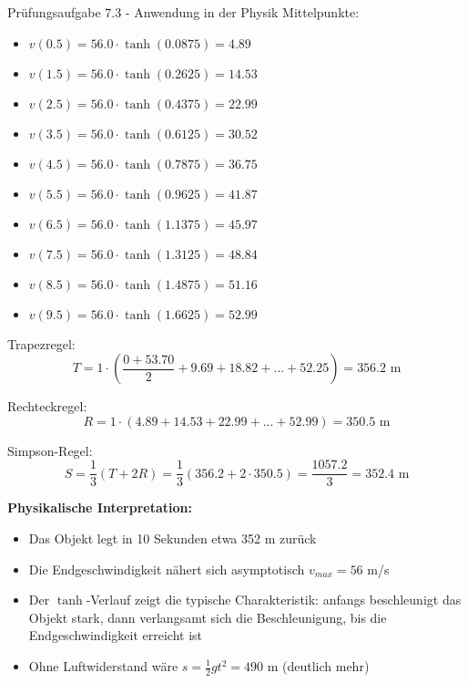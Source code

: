 \begin{example2}{Prüfungsaufgabe 7.3 - Anwendung in der Physik}
Mittelpunkte:
\begin{itemize}
    \item $v(0.5) = 56.0 \cdot \tanh(0.0875) = 4.89$
    \item $v(1.5) = 56.0 \cdot \tanh(0.2625) = 14.53$
    \item $v(2.5) = 56.0 \cdot \tanh(0.4375) = 22.99$
    \item $v(3.5) = 56.0 \cdot \tanh(0.6125) = 30.52$
    \item $v(4.5) = 56.0 \cdot \tanh(0.7875) = 36.75$
    \item $v(5.5) = 56.0 \cdot \tanh(0.9625) = 41.87$
    \item $v(6.5) = 56.0 \cdot \tanh(1.1375) = 45.97$
    \item $v(7.5) = 56.0 \cdot \tanh(1.3125) = 48.84$
    \item $v(8.5) = 56.0 \cdot \tanh(1.4875) = 51.16$
    \item $v(9.5) = 56.0 \cdot \tanh(1.6625) = 52.99$
\end{itemize}

Trapezregel:
$$T = 1 \cdot \left(\frac{0 + 53.70}{2} + 9.69 + 18.82 + ... + 52.25\right) = 356.2 \text{ m}$$

Rechteckregel:
$$R = 1 \cdot (4.89 + 14.53 + 22.99 + ... + 52.99) = 350.5 \text{ m}$$

Simpson-Regel:
$$S = \frac{1}{3}(T + 2R) = \frac{1}{3}(356.2 + 2 \cdot 350.5) = \frac{1057.2}{3} = 352.4 \text{ m}$$

\textbf{Physikalische Interpretation:}
\begin{itemize}
    \item Das Objekt legt in 10 Sekunden etwa 352 m zurück
    \item Die Endgeschwindigkeit nähert sich asymptotisch $v_{max} = 56$ m/s
    \item Der $\tanh$-Verlauf zeigt die typische Charakteristik: anfangs beschleunigt das Objekt stark, dann verlangsamt sich die Beschleunigung, bis die Endgeschwindigkeit erreicht ist
    \item Ohne Luftwiderstand wäre $s = \frac{1}{2}gt^2 = 490$ m (deutlich mehr)
\end{itemize}
\end{example2}
